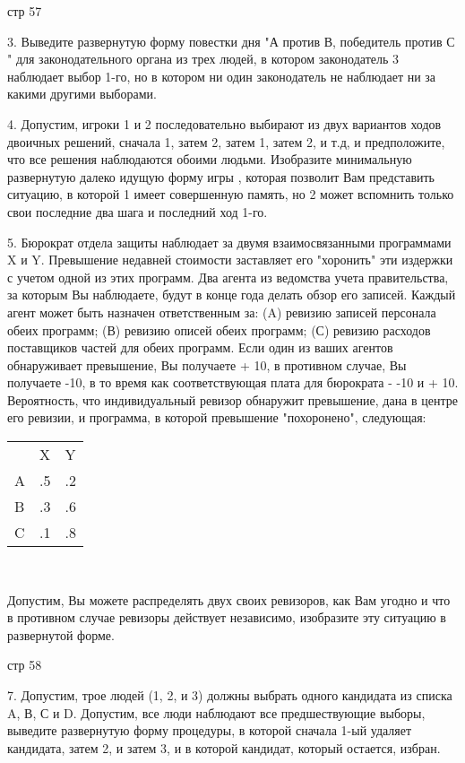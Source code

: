 \documentclass[a4paper,12pt]{article}
\begin{document}
\bigskip стр 57

3. Выведите развернутую форму повестки дня "А
против В, победитель против С " для
законодательного органа из трех людей, в котором
законодатель 3 наблюдает выбор 1-го, но в котором
ни один законодатель не наблюдает ни за какими
другими выборами.

4. Допустим, игроки 1 и 2 последовательно выбирают
из двух вариантов ходов двоичных решений, сначала
1, затем 2, затем 1, затем 2, и т.д, и
предположите, что все решения наблюдаются обоими
людьми. Изобразите минимальную развернутую далеко
идущую форму игры , которая позволит Вам
представить ситуацию, в которой 1 имеет совершенную
память, но 2 может вспомнить только свои последние
два шага и последний ход 1-го.

5. Бюрократ отдела защиты наблюдает за двумя
взаимосвязанными программами X и Y. Превышение
недавней стоимости заставляет его "хоронить" эти
издержки с учетом одной из этих программ. Два
агента из ведомства учета правительства, за которым
Вы наблюдаете, будут в конце года делать обзор его
записей. Каждый агент может быть назначен
ответственным за: (A) ревизию записей персонала
обеих программ; (В) ревизию описей обеих программ;
(С) ревизию расходов поставщиков частей для обеих
программ. Если один из ваших агентов обнаруживает
превышение, Вы получаете + 10, в противном случае,
Вы получаете -10, в то время как соответствующая
плата для бюрократа - -10 и + 10. Вероятность, что
индивидуальный ревизор обнаружит превышение, дана в
центре его ревизии, и программа, в которой
превышение "похоронено", следующая:

\bigskip

\begin{tabular}{lll}
& X & Y \\ \cline{2-3} A & \multicolumn{1}{|l}{.5}
& \multicolumn{1}{|l|}{.2} \\ \cline{2-3} B &
\multicolumn{1}{|l}{.3} & \multicolumn{1}{|l|}{.6}
\\ \cline{2-3} C & \multicolumn{1}{|l}{.1} &
\multicolumn{1}{|l|}{.8} \\ \cline{2-3}
\end{tabular}
\ \

Допустим, Вы можете распределять двух своих
ревизоров, как Вам угодно и что в противном случае
ревизоры действует независимо, изобразите эту
ситуацию в развернутой форме.

стр 58

7. Допустим, трое людей (1, 2, и 3) должны выбрать
одного кандидата из списка A, В, С и D. Допустим,
все люди наблюдают все предшествующие выборы,
выведите развернутую форму процедуры, в которой
сначала 1-ый удаляет кандидата, затем 2, и затем 3,
и в которой кандидат, который остается, избран.
\end{document}
